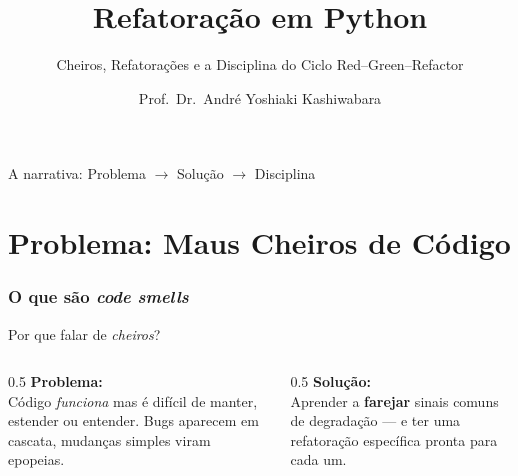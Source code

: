 \documentclass[aspectratio=169]{beamer}
\title{Refatoração em Python}
\subtitle{Cheiros, Refatorações e a Disciplina do Ciclo Red--Green--Refactor}
\author{Prof.\ Dr.\ André Yoshiaki Kashiwabara}
\institute{DCOMP --- Universidade Federal de Sergipe\\
\texttt{andreyoshiaki@dcomp.ufs.br}}
\date{}
\begin{document}
\begin{frame}[plain]
  \titlepage
\end{frame}

\begin{frame}{A narrativa: Problema $\to$ Solução $\to$ Disciplina}
  \begin{center}
  \end{center}
\end{frame}

\part{Problema: Maus Cheiros de Código}
\section{O que são \emph{code smells}}

\begin{frame}{Por que falar de \emph{cheiros}?}
  \begin{columns}[T]
    \begin{column}{0.5\textwidth}
      \textbf{Problema:}\\[0.4em]
      Código \emph{funciona} mas é difícil de manter,
      estender ou entender. Bugs aparecem em cascata,
      mudanças simples viram epopeias.
    \end{column}
    \begin{column}{0.5\textwidth}
      \textbf{Solução:}\\[0.4em]
      Aprender a \textbf{farejar} sinais comuns de
      degradação --- e ter uma refatoração específica
      pronta para cada um.
    \end{column}
  \end{columns}
\end{frame}
\end{document}
